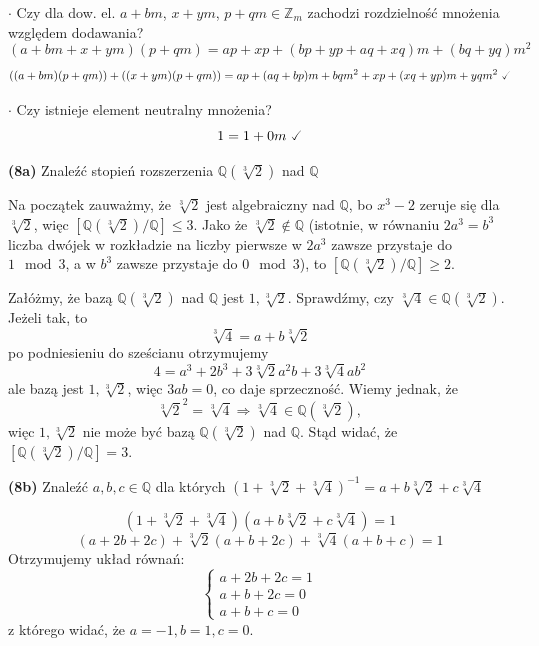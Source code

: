 \documentclass{article}
\begin{document}
$\cdot$ Czy dla dow. el. $a+bm$, $x+ym$, $p+qm\in\mathds{Z}_m$ zachodzi rozdzielność mnożenia względem dodawania?
$$(a+bm+x+ym)(p+qm)=ap+xp+(bp+yp+aq+xq)m+(bq+yq)m^2$$
$$((a+bm)(p+qm))+((x+ym)(p+qm))=ap+(aq+bp)m+bqm^2+xp+(xq+yp)m+yqm^2\ \checked$$

\normalsize
$\cdot$ Czy istnieje element neutralny mnożenia?
$$1=1+0m\ \checked$$

\begin{center}
    \Large \textbf{(8a)} Znaleźć stopień rozszerzenia $\mathds{Q}(\sqrt[3]{2})$ nad $\mathds{Q}$
\end{center}

Na początek zauważmy, że $\sqrt[3]{2}$ jest algebraiczny nad $\mathds{Q}$, bo $x^3-2$ zeruje się dla $\sqrt[3]{2}$, więc $[\mathds{Q}(\sqrt[3]{2})/\mathds{Q}]\leq3$. Jako że $\sqrt[3]{2}\notin\mathds{Q}$ (istotnie, w równaniu $2a^3=b^3$ liczba dwójek w rozkładzie na liczby pierwsze w $2a^3$ zawsze przystaje do $1\mod3$, a w $b^3$ zawsze przystaje do $0\mod3$), to $[\mathds{Q}(\sqrt[3]{2})/\mathds{Q}]\geq2$.

Załóżmy, że bazą $\mathds{Q}(\sqrt[3]{2})$ nad $\mathds{Q}$ jest $1,\sqrt[3]{2}$. Sprawdźmy, czy $\sqrt[3]{4}\in\mathds{Q}(\sqrt[3]{2})$. Jeżeli tak, to
$$\sqrt[3]{4}=a+b\sqrt[3]{2}$$
po podniesieniu do sześcianu otrzymujemy
$$4=a^3+2b^3+3\sqrt[3]{2}a^2b+3\sqrt[3]{4}ab^2$$
ale bazą jest $1,\sqrt[3]{2}$, więc $3ab=0$, co daje sprzeczność. Wiemy jednak, że $$\sqrt[3]{2}^2=\sqrt[3]{4}\Rightarrow\sqrt[3]{4}\in\mathds{Q}(\sqrt[3]{2}),$$ więc $1,\sqrt[3]{2}$ nie może być bazą $\mathds{Q}(\sqrt[3]{2})$ nad $\mathds{Q}$. Stąd widać, że $[\mathds{Q}(\sqrt[3]{2})/\mathds{Q}]=3$.

\begin{center}
    \Large \textbf{(8b)} Znaleźć $a,b,c\in\mathds{Q}$ dla których
    $(1+\sqrt[3]{2}+\sqrt[3]{4})^{-1}=a+b\sqrt[3]{2}+c\sqrt[3]{4}$
\end{center}
$$(1+\sqrt[3]{2}+\sqrt[3]{4})(a+b\sqrt[3]{2}+c\sqrt[3]{4})=1$$
$$(a+2b+2c)+\sqrt[3]{2}(a+b+2c)+\sqrt[3]{4}(a+b+c)=1$$
Otrzymujemy układ równań:
$$\left\{\begin{array}{l}
a+2b+2c=1\\
a+b+2c=0\\
a+b+c=0
\end{array}\right.$$
z którego widać, że $a=-1, b=1, c=0$.
\end{document}
